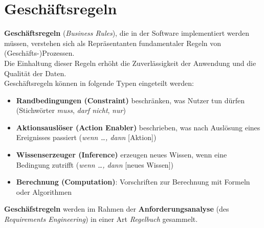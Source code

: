 \section{Geschäftsregeln}


\begin{tcolorbox}[title=Geschäftsregeln]
    \textbf{Geschäftsregeln} (\textit{Business Rules}), die in der Software implementiert werden müssen, verstehen sich als Repräsentanten fundamentaler Regeln von (Geschäfts-)Prozessen.\\
    Die Einhaltung dieser Regeln erhöht die Zuverlässigkeit der Anwendung und die Qualität der Daten.\\

    \noindent
    Geschäftsregeln können in folgende Typen eingeteilt werden:

    \begin{itemize}
        \item \textbf{Randbedingungen (Constraint)} beschränken, was Nutzer tun dürfen (Stichwörter \textit{muss}, \textit{darf nicht}, \textit{nur})
        \item \textbf{Aktionsauslöser (Action Enabler)} beschrieben, was nach Auslösung eines Ereignisses passiert (\textit{wenn \ldots, dann} [Aktion])
        \item \textbf{Wissenserzeuger (Inference)} erzeugen neues Wissen, wenn eine Bedingung zutrifft (\textit{wenn \ldots, dann} [neues Wissen])
        \item \textbf{Berechnung (Computation)}: Vorschriften zur Berechnung mit Formeln oder Algorithmen
    \end{itemize}

    \noindent
    \textbf{Geschäfstregeln} werden im Rahmen der \textbf{Anforderungsanalyse} (des \textit{Requirements Engineering}) in einer Art \textit{Regelbuch} gesammelt.


\end{tcolorbox}